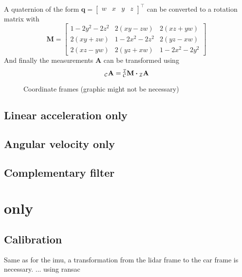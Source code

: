 A quaternion of the form
$\mathbf{q} = \left[\begin{array}{llll} w & x & y & z \end{array}\right]^{\top}$
can be converted to a rotation matrix with
\begin{equation}
    \mathbf{M} =
    \left[
        \begin{array}{ccc}
            1-2 y^{2}-2 z^{2} & 2(x y-z w) & 2(x z+y w) \\
            2(x y+z w) & 1-2 x^{2}-2 z^{2} & 2(y z-x w) \\
            2(x z-y w) & 2(y z+x w) & 1-2 x^{2}-2 y^{2}
        \end{array}
        \right]
    \end{equation}
And finally the measurements $\mathbf{A}$ can be transformed using
\begin{equation}
    \vincs{A}{c} = \mtf{i}{c} \vdot \vincs{A}{i}
\end{equation}

\begin{figure}[htpb]
    \centering
    
	\caption{Coordinate frames (graphic might not be necessary)}
    \label{fig:tikz_car_frames}
\end{figure}

\subsection{Linear acceleration only}


\subsection{Angular velocity only}


\subsection{Complementary filter}



\section{ only}
\subsection{Calibration}
Same as for the \acrshort{imu}, a transformation from the \acrshort{lidar} frame to the car frame is necessary.
... using \acrfull{ransac}

